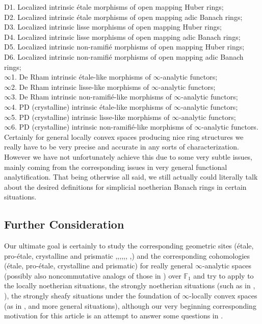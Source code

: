\documentclass[12pt]{amsart}
\theoremstyle{definition}
\numberwithin{equation}{section}
\begin{document}
\indent D1. Localized intrinsic \'etale morphisms of open mapping Huber rings;\\
\indent D2. Localized intrinsic \'etale morphisms of open mapping adic Banach rings;\\ 
\indent D3. Localized intrinsic lisse morphisms of open mapping Huber rings;\\
\indent D4. Localized intrinsic lisse morphisms of open mapping adic Banach rings;\\
\indent D5. Localized intrinsic non-ramifi\'e morphisms of open mapping Huber rings;\\
\indent D6. Localized intrinsic non-ramifi\'e morphisms of open mapping adic Banach rings;\\
\indent $\infty$1. De Rham intrinsic \'etale-like morphisms of $\infty$-analytic functors;\\
\indent $\infty$2. De Rham intrinsic lisse-like morphisms of $\infty$-analytic functors;\\ 
\indent $\infty$3. De Rham intrinsic non-ramifi\'e-like morphisms of $\infty$-analytic functors;\\
\indent $\infty$4. PD (crystalline) intrinsic \'etale-like morphisms of $\infty$-analytic functors;\\
\indent $\infty$5. PD (crystalline) intrinsic lisse-like morphisms of $\infty$-analytic functors;\\ 
\indent $\infty$6. PD (crystalline) intrinsic non-ramifi\'e-like morphisms of $\infty$-analytic functors.\\

\indent Certainly for general locally convex spaces producing nice ring structures we really have to be very precise and accurate in any sorts of characterization. However we have not unfortunately achieve this due to some very subtle issues, mainly coming from the corresponding issues in very general functional analytification. That being otherwise all said, we still actually could literally talk about the desired definitions for simplicial noetherian Banach rings in certain situations.



\subsection{Further Consideration}

Our ultimate goal is certainly to study the corresponding geometric sites (\'etale, pro-\'etale, crystalline and prismatic \cite{SGAIV},\cite{Gro1},\cite{Sch1},\cite{KL1},\cite{KL2},\cite{BS}, \cite{Dr1},\cite{Dr2}) and the corresponding cohomologies (\'etale, pro-\'etale, crystalline and prismatic) for really general $\infty$-analytic spaces (possibly also noncommutative analogs of those in \cite{KR1}) over $\mathbb{F}_1$ and try to apply to the locally noetherian situations, the strongly noetherian situations (such as in \cite{G1}, \cite{GL}), the strongly sheafy situations under the foundation of $\infty$-locally convex spaces (as in \cite{HK}, \cite{KL1} and more general situations), although our very beginning corresponding motivation for this article is an attempt to answer some questions in \cite[Appendix A5]{Ked1}. 
\end{document}
